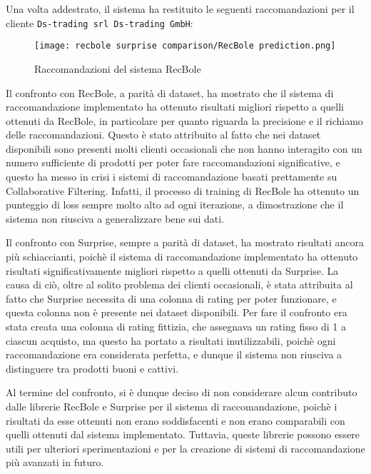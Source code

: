 Una volta addestrato, il sistema ha restituito le seguenti raccomandazioni per il cliente \texttt{Ds-trading srl Ds-trading GmbH}:

\begin{figure}[h]
    \centering
    \texttt{[image: recbole surprise comparison/RecBole prediction.png]}
    \caption{Raccomandazioni del sistema RecBole}
    \label{fig:recbole-recommendations}
\end{figure}

Il confronto con RecBole, a parità di dataset, ha mostrato che il sistema di raccomandazione implementato ha ottenuto risultati migliori rispetto a quelli ottenuti da RecBole, in particolare per quanto riguarda la precisione e il richiamo delle raccomandazioni. Questo è stato attribuito al fatto che nei dataset disponibili sono presenti molti clienti occasionali che non hanno interagito con un numero sufficiente di prodotti per poter fare raccomandazioni significative, e questo ha messo in crisi i sistemi di raccomandazione basati prettamente su Collaborative Filtering. Infatti, il processo di training di RecBole ha ottenuto un punteggio di loss sempre molto alto ad ogni iterazione, a dimostrazione che il sistema non riusciva a generalizzare bene sui dati.

Il confronto con Surprise, sempre a parità di dataset, ha mostrato risultati ancora più schiaccianti, poichè il sistema di raccomandazione implementato ha ottenuto risultati significativamente migliori rispetto a quelli ottenuti da Surprise. La causa di ciò, oltre al solito problema dei clienti occasionali, è stata attribuita al fatto che Surprise necessita di una colonna di rating per poter funzionare, e questa colonna non è presente nei dataset disponibili. Per fare il confronto era stata creata una colonna di rating fittizia, che assegnava un rating fisso di 1 a ciascun acquisto, ma questo ha portato a risultati inutilizzabili, poichè ogni raccomandazione era considerata perfetta, e dunque il sistema non riusciva a distinguere tra prodotti buoni e cattivi.

Al termine del confronto, si è dunque deciso di non considerare alcun contributo dalle librerie RecBole e Surprise per il sistema di raccomandazione, poichè i risultati da esse ottenuti non erano soddisfacenti e non erano comparabili con quelli ottenuti dal sistema implementato. Tuttavia, queste librerie possono essere utili per ulteriori sperimentazioni e per la creazione di sistemi di raccomandazione più avanzati in futuro.


